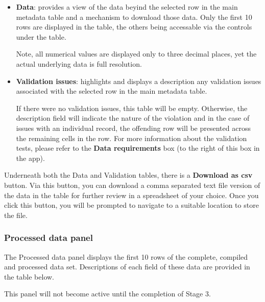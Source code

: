 \documentclass[
  8pt,
  a4paper]{article}
\begin{document}
\begin{itemize}
\item
  \textbf{Data}: provides a view of the data beyind the selected row in
  the main metadata table and a mechanism to download those data. Only
  the first 10 rows are displayed in the table, the others being
  accessable via the controls under the table.

  Note, all numerical values are displayed only to three decimal places,
  yet the actual underlying data is full resolution.
\item
  \textbf{Validation issues}: highlights and displays a description any
  validation issues associated with the selected row in the main
  metadata table.

  If there were no validation issues, this table will be empty.
  Otherwise, the description field will indicate the nature of the
  violation and in the case of issues with an individual record, the
  offending row will be presented across the remaining cells in the row.
  For more information about the validation tests, please refer to the
  \textbf{Data requirements} box (to the right of this box in the app).
\end{itemize}

Underneath both the Data and Validation tables, there is a
\textbf{Download as csv} button. Via this button, you can download a
comma separated text file version of the data in the table for further
review in a spreadsheet of your choice. Once you click this button, you
will be prompted to navigate to a suitable location to store the file.

\subsubsection{Processed data panel}\label{processed-data-panel}

The Processed data panel displays the first 10 rows of the complete,
compiled and processed data set. Descriptions of each field of these
data are provided in the table below.

\begin{tcolorbox}[enhanced jigsaw, left=2mm, leftrule=.75mm, bottomrule=.15mm, toptitle=1mm, colbacktitle=quarto-callout-note-color!10!white, bottomtitle=1mm, arc=.35mm, colback=white, breakable, opacitybacktitle=0.6, coltitle=black, colframe=quarto-callout-note-color-frame, titlerule=0mm, toprule=.15mm, opacityback=0, title=\textcolor{quarto-callout-note-color}{\faInfo}\hspace{0.5em}{Note}, rightrule=.15mm]

This panel will not become active until the completion of Stage 3.

\end{tcolorbox}
\end{document}
